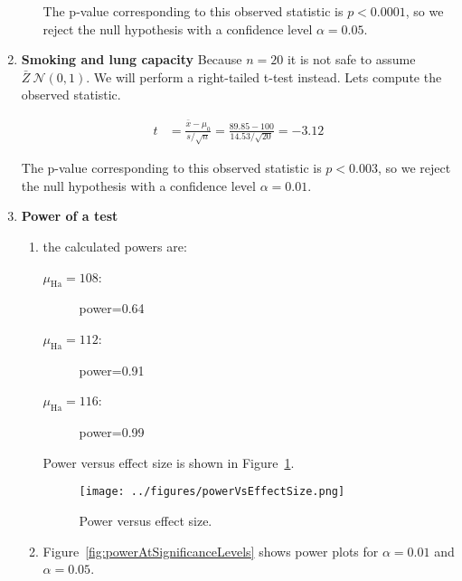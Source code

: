 \documentclass[12pt]{article}
\begin{document}
\begin{enumerate}
\begin{enumerate}[(a)]
                The p-value corresponding to this observed statistic is
                $p<0.0001$, so we reject the
                null hypothesis with a confidence level $\alpha=0.05$.

        \end{enumerate}

    \item \textbf{Smoking and lung capacity}
        Because $n=20$ it is not safe to assume $\bar{Z}~\mathcal{N}(0,1)$. We
        will perform a right-tailed t-test instead. Lets compute the observed
        statistic.

        \begin{align*}
            t &= \frac{\bar{x}-\mu_0}{s/\sqrt{n}}=\frac{89.85-100}{14.53/\sqrt{20}}=-3.12
        \end{align*}

        The p-value corresponding to this observed statistic is
        $p<0.003$, so we reject the
        null hypothesis with a confidence level $\alpha=0.01$.

    \item \textbf{Power of a test}

        \begin{enumerate}
            \item the calculated powers are:
                \begin{description}
                    \item[$\mu_\text{Ha}=108$:] power=0.64
                    \item[$\mu_\text{Ha}=112$:] power=0.91
                    \item[$\mu_\text{Ha}=116$:] power=0.99
                \end{description}

                Power versus effect size is shown in
                Figure~\ref{fig:powerVsEffectSize}.

                \begin{figure}
                    \begin{center}
                        \texttt{[image: ../figures/powerVsEffectSize.png]}
                    \end{center}
                    \caption{Power versus effect size.}
                    \label{fig:powerVsEffectSize}
                \end{figure}

            \item Figure~\ref{fig:powerAtSignificanceLevels} shows power plots for
                $\alpha=0.01$ and $\alpha=0.05$.


\end{enumerate}
\end{enumerate}
\end{document}
